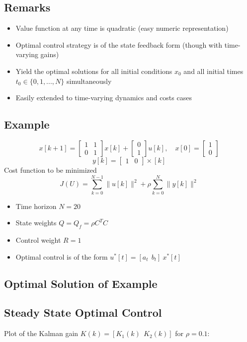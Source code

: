 \documentclass[10pt,a4paper,oneside]{article}
\begin{document}
\subsection{Remarks}
\begin{itemize}
	\item Value function at any time is quadratic (easy numeric representation)
	\item Optimal control strategy is of the state feedback form (though with time-varying gains)
	\item Yield the optimal solutions for all initial conditions $x_0$ and all initial times $t_0\in\{0,1,...,N\}$ simultaneously
	\item Easily extended to time-varying dynamics and costs cases
\end{itemize}
\subsection{Example}
$$
x[k+1]=\left[\begin{array}{ll}{1} & {1} \\ {0} & {1}\end{array}\right] x[k]+\left[\begin{array}{l}{0} \\ {1}\end{array}\right] u[k], \quad x[0]=\left[\begin{array}{l}{1} \\ {0}\end{array}\right]
$$
$$
y[k]=\left[\begin{array}{ll}{1} & {0}\end{array}\right] \times[k]
$$
Cost function to be minimized
$$
J(U)=\sum_{k=0}^{N-1}\|u[k]\|^{2}+\rho \sum_{k=0}^{N}\|y[k]\|^{2}
$$
\begin{itemize}
	\item Time horizon $N=20$
	\item State weights $Q=Q_f=\rho C^TC$
	\item Control weight $R=1$
	\item Optimal control is of the form $u^*[t]=[a_t\ \ b_t]\ x^*[t]$ 
\end{itemize}
\subsection{Optimal Solution of Example}
\subsection{Steady State Optimal Control}
Plot of the Kalman gain $K(k)=[K_1(k)\ \ K_2(k)]$ for $\rho=0.1$:
\end{document}
